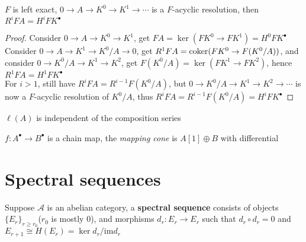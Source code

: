 \documentclass[main]{subfiles}
\begin{document}
\begin{proposition}
$F$ is left exact, $0\to A\to K^0\to K^1\to\cdots$ is a $F$-acyclic resolution, then $R^iFA=H^iFK^\bullet$
\end{proposition}

\begin{proof}
Consider $0\to A\to K^0\to K^1$, get $FA=\ker(FK^0\to FK^1)=H^0FK^\bullet$ \\
Consider $0\to A\to K^1\to K^0/A\to 0$, get $R^1FA=\operatorname{coker}(FK^0\to F(K^0/A))$, and consider $0\to K^0/A\to K^1\to K^2$, get $F(K^0/A)=\ker(FK^1\to FK^2)$, hence $R^1FA=H^1FK^\bullet$ \\
For $i>1$, still have $R^iFA=R^{i-1}F(K^0/A)$, but $0\to K^0/A\to K^1\to K^2\to\cdots$ is now a $F$-acyclic resolution of $K^0/A$, thus $R^iFA=R^{i-1}F(K^0/A)=H^iFK^\bullet$
\end{proof}

\begin{lemma}
$\ell(A)$ is independent of the composition series
\end{lemma}

\begin{definition}
$f:A^\bullet\to B^\bullet$ is a chain map, the \textit{mapping cone} is $A[1]\oplus B$ with differential
\end{definition}

\section{Spectral sequences}

\begin{definition}
Suppose $\mathscr A$ is an abelian category, a \textbf{spectral sequence} consists of objects $\{E_r\}_{r\geq r_0}$($r_0$ is mostly $0$), and morphisms $d_r:E_r\to E_r$ such that $d_r\circ d_r=0$ and $E_{r+1}\cong H(E_r)=\ker d_r/\mathrm{im}d_r$
\end{definition}
\end{document}
